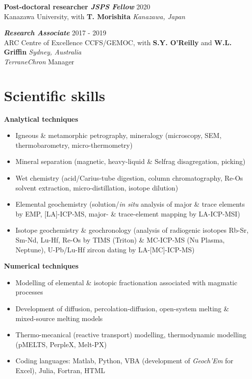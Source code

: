 \documentclass[a4paper,11pt]{article}
\begin{document}
    \textbf{Post-doctoral researcher \textit{JSPS Fellow}}
    \hfill {2020}\\
    Kanazawa University, with \textbf{T. Morishita}
    \hfill \textit{Kanazawa, Japan}
    
    \textbf{\textit{Research Associate}}
    \hfill {2017 - 2019}\\
    ARC Centre of Excellence CCFS/GEMOC, with \textbf{S.Y. O'Reilly} and \textbf{W.L. Griffin}
    \hfill \textit{Sydney, Australia}\\
    \textit{TerraneChron} Manager
    
\section{Scientific skills}

    \textbf{Analytical techniques} 
    \begin{itemize}[itemsep=0pt,parsep=2pt]
        \item Igneous \& metamorphic petrography, mineralogy (microscopy, SEM, thermobarometry, micro-thermometry)
        \item Mineral separation (magnetic, heavy-liquid \& Selfrag disagregation, picking)
        \item Wet chemistry (acid/Carius-tube digestion, column chromatography, Re-Os solvent extraction, micro-distillation, isotope dilution)
        \item Elemental geochemistry (solution/\textit{in situ} analysis of major \& trace elements by EMP, [LA]-ICP-MS, major- \& trace-element mapping by LA-ICP-MSI)
        \item Isotope geochemistry \& geochronology (analysis of radiogenic isotopes Rb-Sr, Sm-Nd, Lu-Hf, Re-Os by TIMS (Triton) \& MC-ICP-MS (Nu Plasma, Neptune), U-Pb/Lu-Hf zircon dating by LA-[MC]-ICP-MS)
    \end{itemize}
    
    \textbf{Numerical techniques}
    \begin{itemize}[itemsep=0pt,parsep=2pt]
        \item Modelling of elemental \& isotopic fractionation associated with magmatic processes
        \item Development of diffusion, percolation-diffusion, open-system melting \& mixed-source melting models
        \item Thermo-mecanical (reactive transport) modelling, thermodynamic modelling (pMELTS, PerpleX, Melt-PX)
        \item Coding languages: Matlab, Python, VBA (development of \textit{Geoch’Em} for Excel), Julia, Fortran, HTML
        
    \end{itemize}
    
\end{document}
